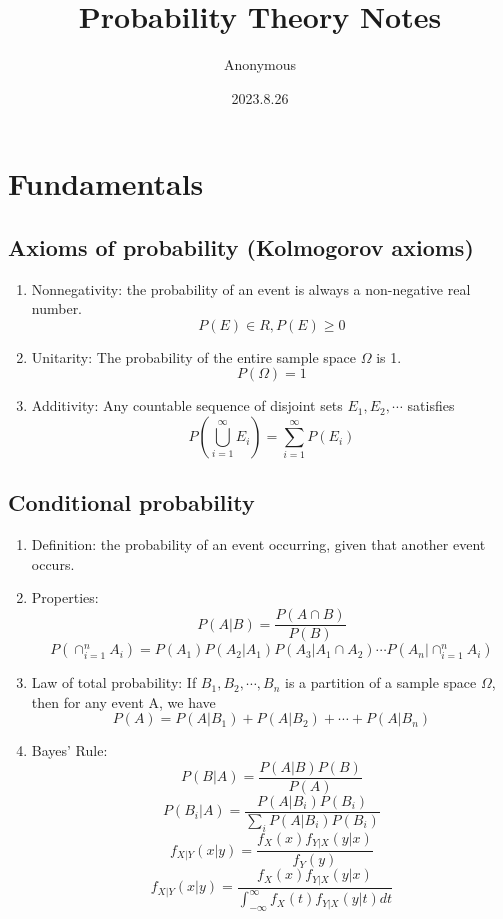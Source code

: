 \documentclass[a4paper]{article}
\title{Probability Theory Notes}
\author{Anonymous}
\date{2023.8.26}
\begin{document}
\maketitle

\section{Fundamentals}
\subsection{Axioms of probability (Kolmogorov axioms)}
	\begin{enumerate}
	\item Nonnegativity: the probability of an event is always a non-negative real number.
$$P(E)\in R,P(E)\geq0$$
	\item Unitarity: The probability of the entire sample space $\Omega$ is 1.
$$P(\Omega)=1$$
	\item Additivity: Any countable sequence of disjoint sets $E_1,E_2,\cdots$ satisfies
$$P(\bigcup_{i=1}^{\infty}E_i)=\sum_{i=1}^{\infty}P(E_i)$$
	\end{enumerate}

\subsection{Conditional probability}
	\begin{enumerate}
	\item Definition: the probability of an event occurring, given that another event occurs.
	\item Properties:
$$P(A|B)=\frac{P(A\cap B)}{P(B)}$$
$$P(\cap_{i=1}^nA_i)=P(A_1)P(A_2|A_1)P(A_3|A_1\cap A_2)\cdots P(A_n|\cap_{i=1}^nA_i)$$
	\item Law of total probability: If $B_1,B_2,\cdots,B_n$ is a partition of a sample space $\Omega$, then for any event A, we have
$$P(A)=P(A|B_1)+P(A|B_2)+\cdots+P(A|B_n)$$
	\item Bayes' Rule: 
$$P(B|A)=\frac{P(A|B)P(B)}{P(A)}$$
$$P(B_i|A)=\frac{P(A|B_i)P(B_i)}{\sum_iP(A|B_i)P(B_i)}$$
$$f_{X|Y}(x|y)=\frac{f_X(x)f_{Y|X}(y|x)}{f_Y(y)}$$
$$f_{X|Y}(x|y)=\frac{f_X(x)f_{Y|X}(y|x)}{\int_{-\infty}^{\infty}f_X(t)f_{Y|X}(y|t)dt}$$
	\end{enumerate}
\end{document}
